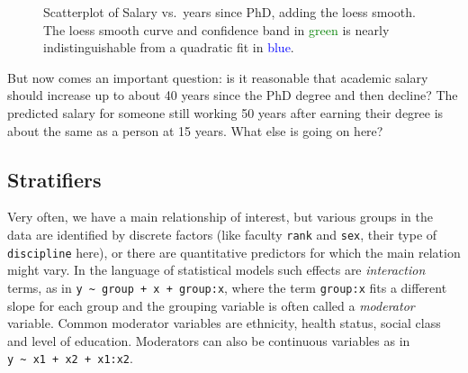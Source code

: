 \documentclass[
  letterpaper,
  10pt,
  krantz2]{krantz}
\begin{document}
\begin{figure}[H]


\caption{\label{fig-Salaries-loess}Scatterplot of Salary vs.~years since
PhD, adding the loess smooth. The loess smooth curve and confidence band
in \textcolor{green}{green} is nearly indistinguishable from a quadratic
fit in \textcolor{blue}{blue}.}

\end{figure}%

But now comes an important question: is it reasonable that academic
salary should increase up to about 40 years since the PhD degree and
then decline? The predicted salary for someone still working 50 years
after earning their degree is about the same as a person at 15 years.
What else is going on here?

\subsection{Stratifiers}\label{stratifiers}

Very often, we have a main relationship of interest, but various groups
in the data are identified by discrete factors (like faculty
\texttt{rank} and \texttt{sex}, their type of \texttt{discipline} here),
or there are quantitative predictors for which the main relation might
vary. In the language of statistical models such effects are
\emph{interaction} terms, as in
\texttt{y\ \textasciitilde{}\ group\ +\ x\ +\ group:x}, where the term
\texttt{group:x} fits a different slope for each group and the grouping
variable is often called a \emph{moderator} variable. Common moderator
variables are ethnicity, health status, social class and level of
education. Moderators can also be continuous variables as in
\texttt{y\ \textasciitilde{}\ x1\ +\ x2\ +\ x1:x2}.
\end{document}
